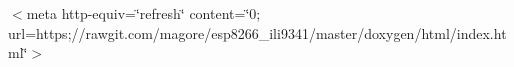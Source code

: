 $<$meta http-\/equiv=\char`\"{}refresh\char`\"{} content=\char`\"{}0; url=https;//rawgit.\-com/magore/esp8266\-\_\-ili9341/master/doxygen/html/index.\-html\char`\"{}$>$ 